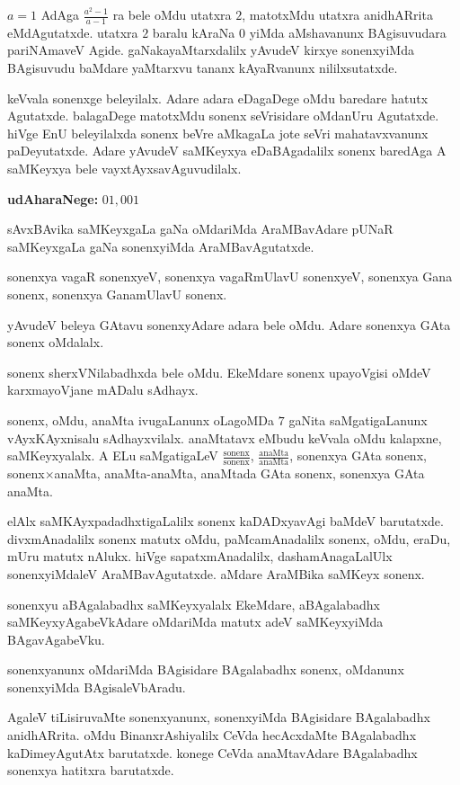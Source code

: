 $a=1$ AdAga $\frac{a^2-1}{a-1}$ ra bele oMdu utatxra $2$, matotxMdu utatxra anidhARrita eMdAgutatxde. utatxra $2$ baralu kAraNa $0$ yiMda aMshavanunx BAgisuvudara pari\-NAmaveV Agide. gaNakayaMtarxdalilx yAvudeV kirxye sonenxyiMda BAgisuvudu baMdare yaMtarxvu tananx kAyaRvanunx nililxsutatxde.

keVvala sonenxge beleyilalx. Adare adara eDagaDege oMdu baredare hatutx Agutatxde. balagaDege matotxMdu sonenx seVrisidare oMdanUru Agutatxde. hiVge EnU beleyilalxda sonenx beVre aMkagaLa jote seVri mahatavxvanunx paDeyutatxde. Adare yAvudeV saMKeyxya eDaBAgadalilx sonenx baredAga A saMKeyxya bele vayxtAyxsavAguvudilalx. 
\smallskip

\textbf{udAharaNege:} $01,001$
\vskip 3pt

sAvxBAvika saMKeyxgaLa gaNa oMdariMda AraMBavAdare pUNaR saMKeyxgaLa gaNa sonenx\-yiMda AraMBavAgutatxde.

sonenxya vagaR sonenxyeV, sonenxya vagaRmUlavU sonenxyeV, sonenxya Gana sonenx, sonenxya GanamUlavU sonenx.
\newpage

yAvudeV beleya GAtavu sonenxyAdare adara bele oMdu. Adare sonenxya GAta sonenx oMdalalx.

sonenx sherxVNilabadhxda bele oMdu. EkeMdare sonenx upayoVgisi oMdeV karxma\-yoVjane mADalu sAdhayx.

sonenx, oMdu, anaMta ivugaLanunx oLagoMDa $7$ gaNita saMgatigaLanunx vAyxKAyx\-nisalu sAdhayxvilalx. anaMtatavx eMbudu keVvala oMdu kalapxne, saMKeyxyalalx. A ELu saMgatigaLeV $\frac{\text{sonenx}}{\text{sonenx}}$, $\frac{\text{anaMta}}{\text{anaMta}}$, sonenxya GAta sonenx, sonenx$\times$anaMta, anaMta-anaMta, anaMtada GAta sonenx, sonenxya GAta anaMta.

elAlx saMKAyxpadadhxtigaLalilx sonenx kaDADxyavAgi baMdeV barutatxde. divxmAnadalilx sonenx matutx oMdu, paMcamAnadalilx sonenx, oMdu, eraDu, mUru matutx nAlukx. hiVge sapatxmAnadalilx, dashamAnagaLalUlx sonenxyiMdaleV AraMBavAgutatxde. aMdare AraMBika saMKeyx sonenx.

sonenxyu aBAgalabadhx saMKeyxyalalx EkeMdare, aBAgalabadhx saMKeyxyAgabeVkAdare oMdariMda matutx adeV saMKeyxyiMda BAgavAgabeVku.

sonenxyanunx oMdariMda BAgisidare BAgalabadhx sonenx, oMdanunx sonenxyiMda BAgisaleVbAradu.

AgaleV tiLisiruvaMte sonenxyanunx, sonenxyiMda BAgisidare BAgalabadhx anidhAR\-rita. oMdu BinanxrAshiyalilx CeVda hecAcxdaMte BAgalabadhx kaDimeyAgutAtx barutatxde. konege CeVda anaMtavAdare BAgalabadhx sonenxya hatitxra barutatxde.

